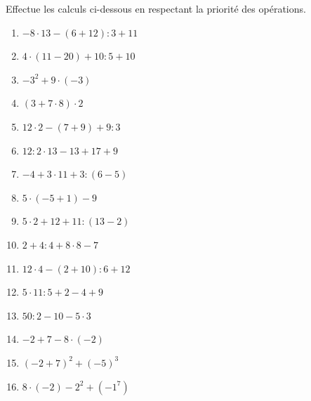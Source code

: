 %
%
	Effectue les calculs ci-dessous en respectant la priorité des opérations.
			\begin{enumerate}[cols=2]
				\item $-8\cdot 13-(6+12):3+11$
				\item $4\cdot (11-20)+10:5+10$
				\item \(-3^2 + 9 \cdot (-3)\)
				\item \((3 + 7 \cdot 8) \cdot 2\)
				\item $12\cdot 2-(7+9)+9:3$
				\item $12:2\cdot 13-13+17+9$
				\item $-4+3\cdot 11+3:(6-5)$
				\item $5\cdot (-5+1)-9$
				\item $5\cdot 2+12+11:(13-2)$
				\item $2+4:4+8\cdot 8-7$
				\item $12\cdot 4-(2+10):6+12$
				\item $5\cdot 11:5+2-4+9$
				\item \(50 : 2 - 10 - 5 \cdot 3\)
				\item \(-2 + 7 - 8 \cdot (-2)\)
				\item \((-2 + 7)^2 + (-5)^3\)
				\item \(8\cdot (-2) - 2^2 + (-1^7)\)
			\end{enumerate}
